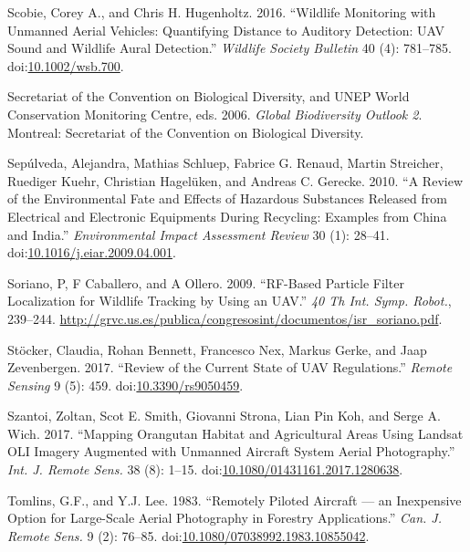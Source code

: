 \documentclass[]{interact}
\theoremstyle{plain}%
\theoremstyle{definition}
\theoremstyle{remark}
\begin{document}
\hypertarget{ref-scobie_wildlife_2016}{}
Scobie, Corey A., and Chris H. Hugenholtz. 2016. ``Wildlife Monitoring
with Unmanned Aerial Vehicles: Quantifying Distance to Auditory
Detection: UAV Sound and Wildlife Aural Detection.'' \emph{Wildlife
Society Bulletin} 40 (4): 781--785.
doi:\href{https://doi.org/10.1002/wsb.700}{10.1002/wsb.700}.

\hypertarget{ref-secretariat_of_the_convention_on_biological_diversity_global_2006}{}
Secretariat of the Convention on Biological Diversity, and UNEP World
Conservation Monitoring Centre, eds. 2006. \emph{Global Biodiversity
Outlook 2}. Montreal: Secretariat of the Convention on Biological
Diversity.

\hypertarget{ref-sepulveda_review_2010}{}
Sepúlveda, Alejandra, Mathias Schluep, Fabrice G. Renaud, Martin
Streicher, Ruediger Kuehr, Christian Hagelüken, and Andreas C. Gerecke.
2010. ``A Review of the Environmental Fate and Effects of Hazardous
Substances Released from Electrical and Electronic Equipments During
Recycling: Examples from China and India.'' \emph{Environmental Impact
Assessment Review} 30 (1): 28--41.
doi:\href{https://doi.org/10.1016/j.eiar.2009.04.001}{10.1016/j.eiar.2009.04.001}.

\hypertarget{ref-soriano_rf-based_2009}{}
Soriano, P, F Caballero, and A Ollero. 2009. ``RF-Based Particle Filter
Localization for Wildlife Tracking by Using an UAV.'' \emph{40 Th Int.
Symp. Robot.}, 239--244.
\url{http://grvc.us.es/publica/congresosint/documentos/isr_soriano.pdf}.

\hypertarget{ref-stocker_review_2017}{}
Stöcker, Claudia, Rohan Bennett, Francesco Nex, Markus Gerke, and Jaap
Zevenbergen. 2017. ``Review of the Current State of UAV Regulations.''
\emph{Remote Sensing} 9 (5): 459.
doi:\href{https://doi.org/10.3390/rs9050459}{10.3390/rs9050459}.

\hypertarget{ref-szantoi_mapping_2017}{}
Szantoi, Zoltan, Scot E. Smith, Giovanni Strona, Lian Pin Koh, and Serge
A. Wich. 2017. ``Mapping Orangutan Habitat and Agricultural Areas Using
Landsat OLI Imagery Augmented with Unmanned Aircraft System Aerial
Photography.'' \emph{Int. J. Remote Sens.} 38 (8): 1--15.
doi:\href{https://doi.org/10.1080/01431161.2017.1280638}{10.1080/01431161.2017.1280638}.

\hypertarget{ref-tomlins_remotely_1983}{}
Tomlins, G.F., and Y.J. Lee. 1983. ``Remotely Piloted Aircraft --- an
Inexpensive Option for Large-Scale Aerial Photography in Forestry
Applications.'' \emph{Can. J. Remote Sens.} 9 (2): 76--85.
doi:\href{https://doi.org/10.1080/07038992.1983.10855042}{10.1080/07038992.1983.10855042}.
\end{document}
